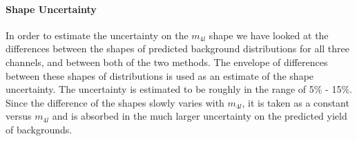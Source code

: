     

\paragraph{Shape Uncertainty}
In order to estimate the uncertainty on the $m_{4l}$ shape we have looked at the differences between the shapes of predicted background distributions for all three channels, and between both of the two methods. The envelope of differences between these shapes of distributions is used as an estimate of the shape uncertainty. The uncertainty is estimated to be roughly in the range of 5\% - 15\%. Since the difference of the shapes slowly varies with $m_{4l}$, it is taken as a constant versus $m_{4l}$  and is absorbed in the much larger uncertainty on the predicted yield of backgrounds. 

